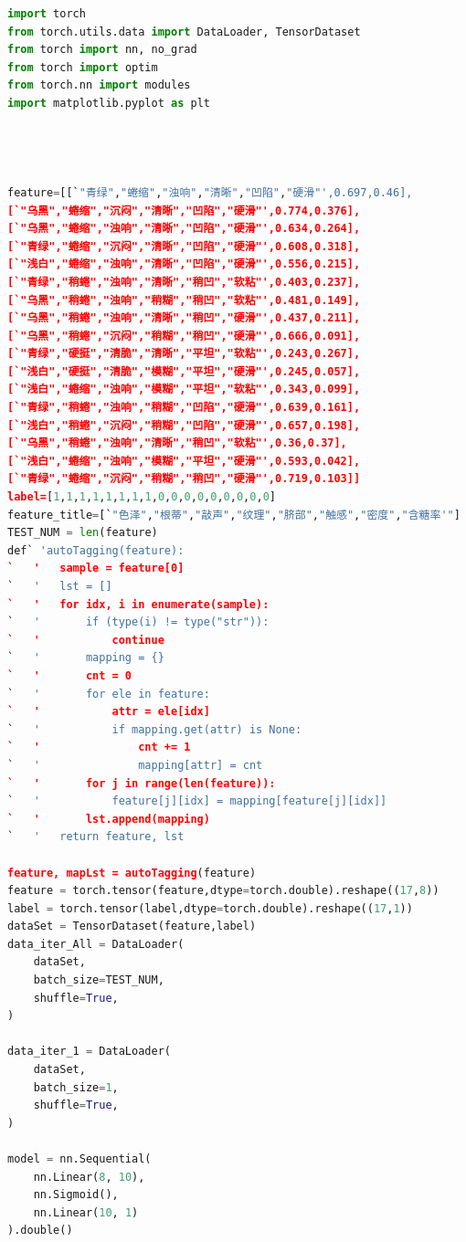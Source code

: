 \documentclass{ctexart}
\begin{document}
\begin{lstlisting}[language=python]
import torch
from torch.utils.data import DataLoader, TensorDataset
from torch import nn, no_grad
from torch import optim
from torch.nn import modules
import matplotlib.pyplot as plt 




feature=[[`"青绿","蜷缩","浊响","清晰","凹陷","硬滑"',0.697,0.46],
[`"乌黑","蜷缩","沉闷","清晰","凹陷","硬滑"',0.774,0.376],
[`"乌黑","蜷缩","浊响","清晰","凹陷","硬滑"',0.634,0.264],
[`"青绿","蜷缩","沉闷","清晰","凹陷","硬滑"',0.608,0.318],
[`"浅白","蜷缩","浊响","清晰","凹陷","硬滑"',0.556,0.215],
[`"青绿","稍蜷","浊响","清晰","稍凹","软粘"',0.403,0.237],
[`"乌黑","稍蜷","浊响","稍糊","稍凹","软粘"',0.481,0.149],
[`"乌黑","稍蜷","浊响","清晰","稍凹","硬滑"',0.437,0.211],
[`"乌黑","稍蜷","沉闷","稍糊","稍凹","硬滑"',0.666,0.091],
[`"青绿","硬挺","清脆","清晰","平坦","软粘"',0.243,0.267],
[`"浅白","硬挺","清脆","模糊","平坦","硬滑"',0.245,0.057],
[`"浅白","蜷缩","浊响","模糊","平坦","软粘"',0.343,0.099],
[`"青绿","稍蜷","浊响","稍糊","凹陷","硬滑"',0.639,0.161],
[`"浅白","稍蜷","沉闷","稍糊","凹陷","硬滑"',0.657,0.198],
[`"乌黑","稍蜷","浊响","清晰","稍凹","软粘"',0.36,0.37],
[`"浅白","蜷缩","浊响","模糊","平坦","硬滑"',0.593,0.042],
[`"青绿","蜷缩","沉闷","稍糊","稍凹","硬滑"',0.719,0.103]]
label=[1,1,1,1,1,1,1,1,0,0,0,0,0,0,0,0,0]
feature_title=[`"色泽","根蒂","敲声","纹理","脐部","触感","密度","含糖率'"]
TEST_NUM = len(feature)
def` 'autoTagging(feature):
`   '   sample = feature[0]
`   '   lst = []
`   '   for idx, i in enumerate(sample):
`   '       if (type(i) != type("str")):
`   '           continue
`   '       mapping = {}
`   '       cnt = 0
`   '       for ele in feature:
`   '           attr = ele[idx]
`   '           if mapping.get(attr) is None:
`   '               cnt += 1
`   '               mapping[attr] = cnt
`   '       for j in range(len(feature)):
`   '           feature[j][idx] = mapping[feature[j][idx]]
`   '       lst.append(mapping)
`   '   return feature, lst

feature, mapLst = autoTagging(feature)
feature = torch.tensor(feature,dtype=torch.double).reshape((17,8))
label = torch.tensor(label,dtype=torch.double).reshape((17,1))
dataSet = TensorDataset(feature,label)
data_iter_All = DataLoader(
    dataSet,
    batch_size=TEST_NUM,
    shuffle=True,
)

data_iter_1 = DataLoader(
    dataSet,
    batch_size=1,
    shuffle=True,
)

model = nn.Sequential(
    nn.Linear(8, 10),
    nn.Sigmoid(),
    nn.Linear(10, 1)
).double()


\end{lstlisting}
\end{document}
